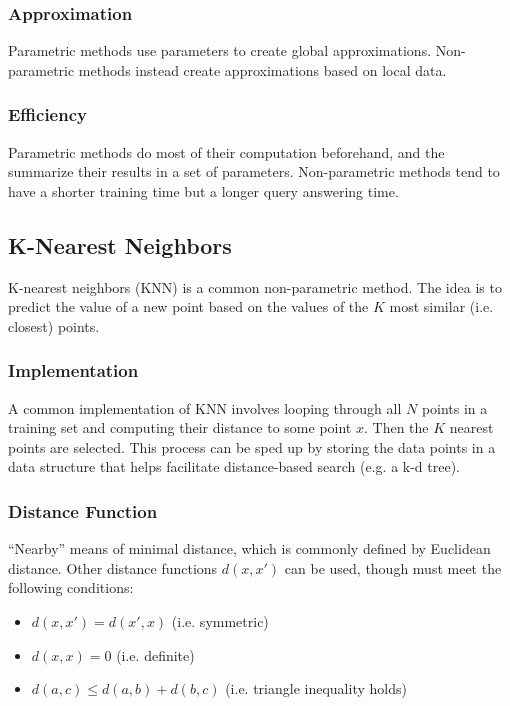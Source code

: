 \documentclass[12pt]{article}
\begin{document}
        \subsubsection{Approximation}
            Parametric methods use parameters to create global approximations. Non-parametric methods instead create approximations based on local data.

        \subsubsection{Efficiency}
            Parametric methods do most of their computation beforehand, and the summarize their results in a set of parameters. Non-parametric methods tend to
            have a shorter training time but a longer query answering time.

    \subsection{K-Nearest Neighbors}
        K-nearest neighbors (KNN) is a common non-parametric method. The idea is to predict the value of a new point based on the values of the $K$ most similar
        (i.e. closest) points.

        \subsubsection{Implementation}
            A common implementation of KNN involves looping through all $N$ points in a training set and computing their distance to some point $x$. Then the $K$ nearest
            points are selected. This process can be sped up by storing the data points in a data structure that helps facilitate distance-based search (e.g. a k-d tree).

        \subsubsection{Distance Function}
            ``Nearby'' means of minimal distance, which is commonly defined by Euclidean distance. Other distance functions $d(x, x')$ can be used, though must meet
            the following conditions:
            \begin{itemize}
              \item $d(x, x') = d(x', x)$ (i.e. symmetric)
              \item $d(x, x) = 0$ (i.e. definite)
              \item $d(a, c) \leq d(a, b) + d(b, c)$ (i.e. triangle inequality holds)
            \end{itemize}
\end{document}
